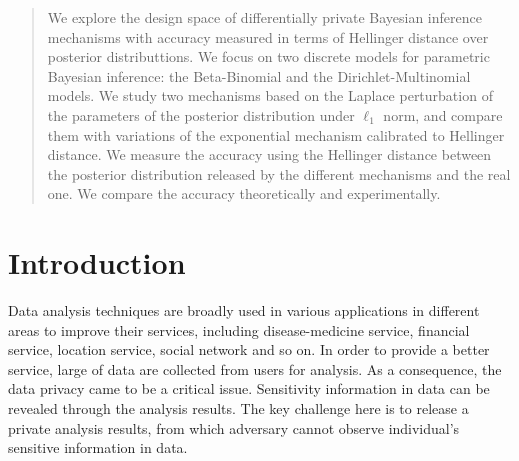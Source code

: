 \documentclass{article}
\begin{document}
\begin{abstract}
We explore the design space of differentially private Bayesian
inference mechanisms with accuracy measured in terms of Hellinger
distance over posterior distributtions.  
We focus on two discrete models for parametric Bayesian
inference: the Beta-Binomial and the Dirichlet-Multinomial
models. We study two mechanisms based on the 
Laplace perturbation of the parameters of the posterior distribution under
$\ell_1$ norm, and compare them with variations of the exponential
mechanism calibrated to Hellinger distance. We
measure the accuracy using the Hellinger distance between the posterior
distribution released by the different mechanisms and the real one.
We compare the accuracy theoretically and experimentally.
\end{abstract}





\section{Introduction}
\label{sec_intro}
Data analysis techniques are broadly used in various applications in different areas to improve their services, including disease-medicine service, financial service, location service, social network and so on. In order to provide a better service, large of data are collected from users for analysis. As a consequence, the data privacy came to be a critical issue. Sensitivity information in data can be revealed through the analysis results. The key challenge here is to release a private analysis results, from which adversary cannot observe individual's sensitive information in data.
\end{document}
